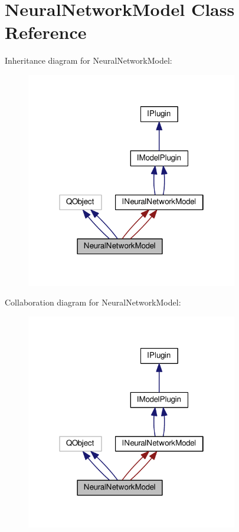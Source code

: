 \hypertarget{class_neural_network_model}{}\section{Neural\+Network\+Model Class Reference}
\label{class_neural_network_model}


Inheritance diagram for Neural\+Network\+Model\+:\nopagebreak
\begin{figure}[H]
\begin{center}
\leavevmode
\includegraphics[width=262pt]{class_neural_network_model__inherit__graph}
\end{center}
\end{figure}


Collaboration diagram for Neural\+Network\+Model\+:\nopagebreak
\begin{figure}[H]
\begin{center}
\leavevmode
\includegraphics[width=262pt]{class_neural_network_model__coll__graph}
\end{center}
\end{figure}
